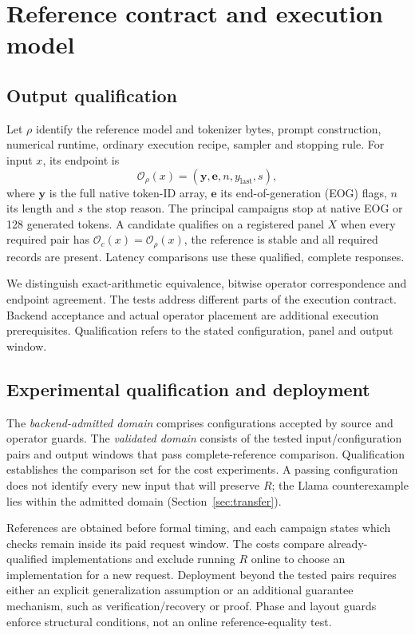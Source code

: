 \section{Reference contract and execution model}
\label{sec:contract}
\subsection{Output qualification}
Let $\rho$ identify the reference model and tokenizer bytes, prompt construction, numerical runtime, ordinary execution recipe, sampler and stopping rule. For input $x$, its endpoint is
\begin{equation}
\mathcal O_\rho(x)=(\mathbf y,\mathbf e,n,y_{\mathrm{last}},s),
\label{eq:endpoint}
\end{equation}
where $\mathbf y$ is the full native token-ID array, $\mathbf e$ its end-of-generation (EOG) flags, $n$ its length and $s$ the stop reason. The principal campaigns stop at native EOG or 128 generated tokens. A candidate qualifies on a registered panel $X$ when every required pair has $\mathcal O_c(x)=\mathcal O_\rho(x)$, the reference is stable and all required records are present. Latency comparisons use these qualified, complete responses.

We distinguish exact-arithmetic equivalence, bitwise operator correspondence and endpoint agreement. The tests address different parts of the execution contract. Backend acceptance and actual operator placement are additional execution prerequisites. Qualification refers to the stated configuration, panel and output window.

\subsection{Experimental qualification and deployment}
\label{sec:qualificationuse}
The \emph{backend-admitted domain} comprises configurations accepted by source and operator guards. The \emph{validated domain} consists of the tested input/configuration pairs and output windows that pass complete-reference comparison. Qualification establishes the comparison set for the cost experiments. A passing configuration does not identify every new input that will preserve $R$; the Llama counterexample lies within the admitted domain (Section~\ref{sec:transfer}).

References are obtained before formal timing, and each campaign states which checks remain inside its paid request window. The costs compare already-qualified implementations and exclude running $R$ online to choose an implementation for a new request. Deployment beyond the tested pairs requires either an explicit generalization assumption or an additional guarantee mechanism, such as verification/recovery or proof. Phase and layout guards enforce structural conditions, not an online reference-equality test.

